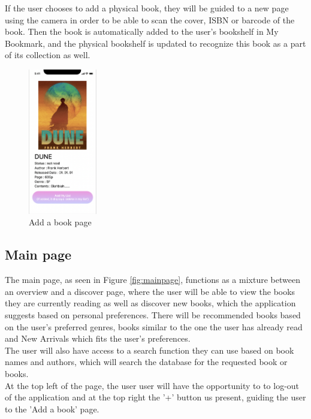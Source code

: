 \documentclass[conference]{IEEEtran}
\begin{document}
If the user chooses to add a physical book, they will be guided to a new page using the camera in order to be able to scan the cover, ISBN or barcode of the book. Then the book is automatically added to the user's bookshelf in My Bookmark, and the physical bookshelf is updated to recognize this book as a part of its collection as well.

\begin{figure}[h]
    \centering
    \includegraphics[width=3cm]{Resources/Specifications/addabook.png}
    \caption{Add a book page}
    \label{fig:addabook}
\end{figure}

\subsection{Main page}
The main page, as seen in Figure \ref{fig:mainpage}, functions as a mixture between an overview and a discover page, where the user will be able to view the books they are currently reading as well as discover new books, which the application suggests based on personal preferences. There will be recommended books based on the user's preferred genres, books similar to the one the user has already read and New Arrivals which fits the user's preferences. \\

The user will also have access to a search function they can use based on book names and authors, which will search the database for the requested book or books.\\
At the top left of the page, the user user will have the opportunity to to log-out of the application and at the top right the '+' button us present, guiding the user to the 'Add a book' page.
\end{document}
